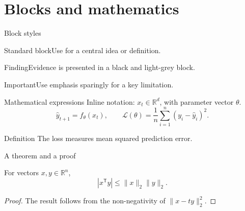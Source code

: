 \documentclass[aspectratio=43]{beamer}
\begin{document}
\section{Blocks and mathematics}
\begin{frame}{Block styles}
  \begin{block}{Standard block}Use for a central idea or definition.\end{block}
  \begin{exampleblock}{Finding}Evidence is presented in a black and light-grey block.\end{exampleblock}
  \begin{alertblock}{Important}Use emphasis sparingly for a key limitation.\end{alertblock}
\end{frame}
\begin{frame}{Mathematical expressions}
  Inline notation: $x_t \in \mathbb{R}^{d}$, with parameter vector $\theta$.
  \begin{equation}
    \hat{y}_{t+1}=f_{\theta}(x_t), \qquad
    \mathcal{L}(\theta)=\frac{1}{n}\sum_{i=1}^{n}(y_i-\hat{y}_i)^2.
  \end{equation}
  \begin{block}{Definition}
    The loss measures mean squared prediction error.
  \end{block}
\end{frame}
\begin{frame}{A theorem and a proof}
  \begin{theorem}
    For vectors $x,y\in\mathbb{R}^{n}$,
    \[
      |x^{\mathsf T}y|\leq \lVert x\rVert_2\lVert y\rVert_2.
    \]
  \end{theorem}
  \begin{proof}
    The result follows from the non-negativity of $\lVert x-ty\rVert_2^2$.
  \end{proof}
\end{frame}
\end{document}
